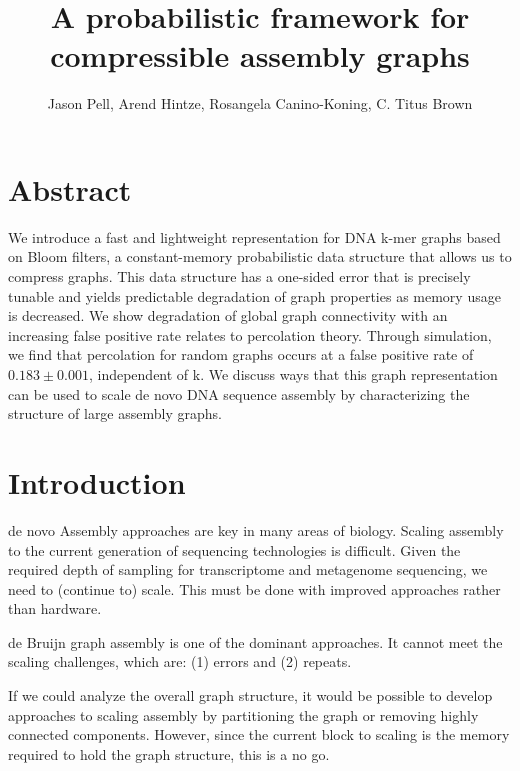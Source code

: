 \documentclass[12pt]{article} \usepackage{simplemargins}
\begin{document}
\title{A probabilistic framework for compressible assembly graphs}
\author{Jason Pell, Arend Hintze, Rosangela Canino-Koning, C. Titus Brown}

\maketitle

\section{Abstract}

We introduce a fast and lightweight representation for DNA k-mer graphs
based on Bloom filters, a constant-memory probabilistic data structure that allows us
to compress graphs.  This data structure has a one-sided
error that is precisely tunable and yields predictable degradation of
graph properties as memory usage is decreased. We show degradation of global 
graph connectivity with an increasing false
positive rate relates to percolation theory. Through 
simulation, we find that percolation for random graphs occurs at a false positive rate 
of $0.183 \pm 0.001$, independent of k. We discuss ways that this
graph representation can be used to scale de novo DNA sequence assembly by characterizing the structure of
large assembly graphs.

\section{Introduction}

de novo Assembly approaches are key in many areas of biology.  Scaling
assembly to the current generation of sequencing technologies is
difficult.  Given the required depth of sampling for transcriptome and
metagenome sequencing, we need to (continue to) scale.  This must be
done with improved approaches rather than hardware.

de Bruijn graph assembly is one of the dominant 
approaches\cite{trinity, panda, pmid21273488, pmid20203603}. 
It cannot meet the scaling challenges, which
are: (1) errors and (2) repeats.  

If we could analyze the overall graph structure, it would be possible
to develop approaches to scaling assembly by partitioning the graph or
removing highly connected components.  However, since the current
block to scaling is the memory required to hold the graph structure,
this is a no go.
\end{document}
